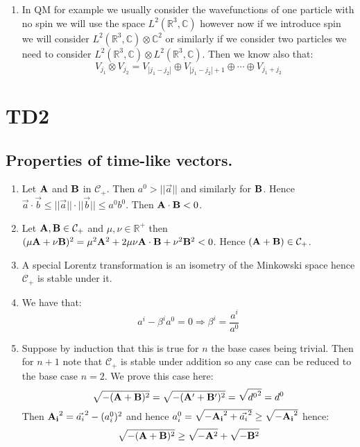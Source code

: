\documentclass[10pt,a4paper]{book}
\begin{document}
\begin{enumerate}
\item In QM for example we usually consider the wavefunctions of one particle with no spin we will use the space $L^2(\mathbb{R}^3, \mathbb{C})$ however now if we introduce spin we will consider $L^2(\mathbb{R}^3, \mathbb{C}) \otimes \mathbb{C}^2$ or similarly if we consider two particles we need to consider $L^2(\mathbb{R}^3, \mathbb{C}) \otimes L^2(\mathbb{R}^3, \mathbb{C})$. Then we know also that:
\[
V_{j_1} \otimes V_{j_2} = V_{|j_1 - j_2|} \oplus V_{|j_1 - j_2| + 1} \oplus \cdots \oplus V_{j_1 + j_2}
\]

\end{enumerate}

\chapter{TD2}
\section{Properties of time-like vectors.}
\begin{enumerate}
\item Let $\vb{A}$ and $\vb{B}$ in $\mathcal{C}_+$. Then $a^0 > || \vec{a} || $ and similarly for $\vb{B}$. Hence $\vec{a}\cdot\vec{b} \leq || \vec{a}|| \cdot || \vec{b}|| \leq a^0 b^0$. Then $\vb{A} \cdot \vb{B} < 0$. 

\item Let $\vb{A}, \vb{B} \in \mathcal{C}_+$ and $\mu, \nu \in \mathbb{R}^+$ then $(\mu\vb{A} + \nu\vb{B})^2 = \mu^2\vb{A}^2 + 2 \mu \nu \vb{A} \cdot \vb{B} + \nu^2 \vb{B}^2 < 0$. Hence $(\vb{A} + \vb{B}) \in \mathcal{C}_+$.

\item A special Lorentz transformation is an isometry of the Minkowski space hence $\mathcal{C}_+$ is stable under it.

\item We have that:
\[
a^{i} - \beta^i a^0 = 0 \Rightarrow \beta^i = \frac{a^{i}}{a^0}
\]

\item Suppose by induction that this is true for $n$ the base cases being trivial. Then for $n+1$ note that $\mathcal{C}_+$ is stable under addition so any case can be reduced to the base case $n = 2$. We prove this case here:
\[
\sqrt{-(\vb{A} + \vb{B})^2} = \sqrt{-(\vb{A'} + \vb{B'})^2} = \sqrt{{d^0}^2} = d^0 
\]
Then $\vb{A_i}^2 = \vec{a_i}^2 - (a^0_i)^2$ and hence $a^0_i = \sqrt{- \vb{A_i}^2 + \vec{a_i}^2} \geq \sqrt{-\vb{A_i}^2}$ hence:
\[
\sqrt{-(\vb{A} + \vb{B})^2} \geq \sqrt{-\vb{A}^2} + \sqrt{-\vb{B}^2}
\]
\end{enumerate}
\end{document}
